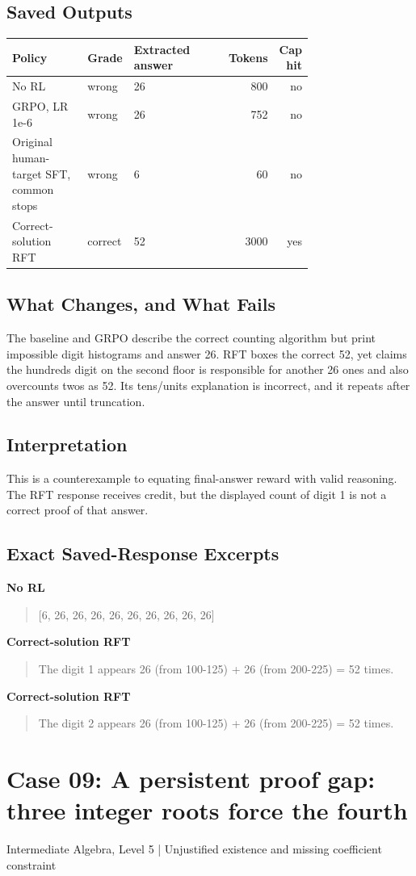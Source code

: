 \documentclass[10pt,letterpaper]{article}
\begin{document}
\subsection*{Saved Outputs}
\small\begin{longtable}{p{0.29\linewidth}p{0.10\linewidth}p{0.35\linewidth}rr}\toprule Policy & Grade & Extracted answer & Tokens & Cap hit\\\midrule
No RL & wrong & 26 & 800 & no\\
GRPO, LR 1e-6 & wrong & 26 & 752 & no\\
Original human-target SFT, common stops & wrong & 6 & 60 & no\\
Correct-solution RFT & correct & 52 & 3000 & yes\\
\bottomrule\end{longtable}\normalsize
\subsection*{What Changes, and What Fails}
The baseline and GRPO describe the correct counting algorithm but print impossible digit histograms and answer 26. RFT boxes the correct 52, yet claims the hundreds digit on the second floor is responsible for another 26 ones and also overcounts twos as 52. Its tens/units explanation is incorrect, and it repeats after the answer until truncation.
\subsection*{Interpretation}
This is a counterexample to equating final-answer reward with valid reasoning. The RFT response receives credit, but the displayed count of digit 1 is not a correct proof of that answer.
\subsection*{Exact Saved-Response Excerpts}
\textbf{No RL}
\begin{quote}\small\raggedright [6, 26, 26, 26, 26, 26, 26, 26, 26, 26]\end{quote}
\textbf{Correct-solution RFT}
\begin{quote}\small\raggedright The digit 1 appears 26 (from 100-125) + 26 (from 200-225) = 52 times.\end{quote}
\textbf{Correct-solution RFT}
\begin{quote}\small\raggedright The digit 2 appears 26 (from 100-125) + 26 (from 200-225) = 52 times.\end{quote}
\clearpage\section*{Case 09: A persistent proof gap: three integer roots force the fourth}
Intermediate Algebra, Level 5 | Unjustified existence and missing coefficient constraint
\end{document}
